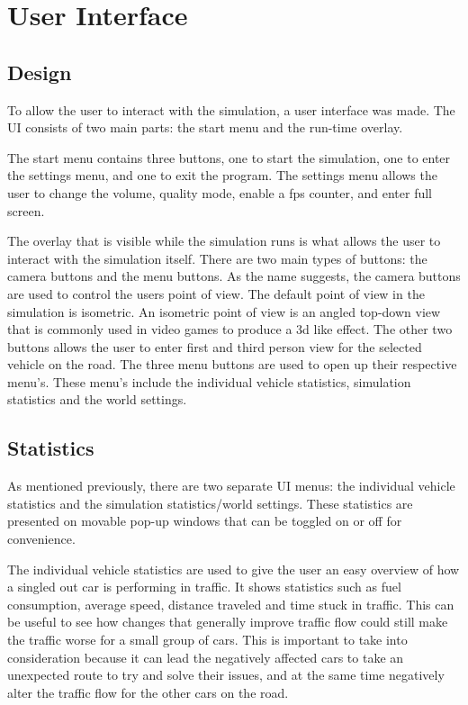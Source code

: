 \section{User Interface}
    \subsection{Design}
        To allow the user to interact with the simulation, a user interface was made. The UI consists of two main parts: the start menu and the run-time overlay. 
    
        The start menu contains three buttons, one to start the simulation, one to enter the settings menu, and one to exit the program. The settings menu allows the user to change the volume, quality mode, enable a fps counter, and enter full screen. 
    
        The overlay that is visible while the simulation runs is what allows the user to interact with the simulation itself. There are two main types of buttons: the camera buttons and the menu buttons. As the name suggests, the camera buttons are used to control the users point of view. The default point of view in the simulation is isometric. An isometric point of view is an angled top-down view that is commonly used in video games to produce a 3d like effect. The other two buttons allows the user to enter first and third person view for the selected vehicle on the road. The three menu buttons are used to open up their respective menu's. These menu's include the individual vehicle statistics, simulation statistics and the world settings.
        
    \subsection{Statistics}
        As mentioned previously, there are two separate UI menus: the individual vehicle statistics and the simulation statistics/world settings. These statistics are presented on movable pop-up windows that can be toggled on or off for convenience.

        The individual vehicle statistics are used to give the user an easy overview of how a singled out car is performing in traffic. It shows statistics such as fuel consumption, average speed, distance traveled and time stuck in traffic. This can be useful to see how changes that generally improve traffic flow could still make the traffic worse for a small group of cars. This is important to take into consideration because it can lead the negatively affected cars to take an unexpected route to try and solve their issues, and at the same time negatively alter the traffic flow for the other cars on the road.

